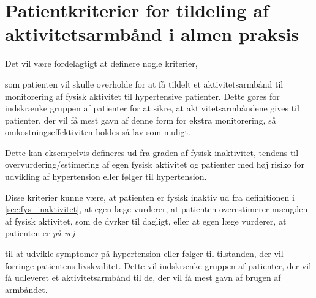 \section{Patientkriterier for tildeling af aktivitetsarmbånd i almen praksis}

\noindent
Det vil være fordelagtigt at definere nogle kriterier, %

som patienten vil skulle overholde for at få tildelt et aktivitetsarmbånd til monitorering af fysisk aktivitet til hypertensive patienter. Dette gøres for indskrænke gruppen af patienter for at sikre, at aktivitetsarmbåndene gives til patienter, der vil få mest gavn af denne form for ekstra monitorering, så omkostningseffektiviten holdes så lav som muligt.

Dette kan eksempelvis defineres ud fra graden af fysisk inaktivitet, tendens til overvurdering/estimering af egen fysisk aktivitet og patienter med høj risiko for udvikling af hypertension eller følger til hypertension. 

Disse kriterier kunne være, at patienten er fysisk inaktiv ud fra definitionen i \autoref{sec:fys_inaktivitet}, at egen læge vurderer, at patienten overestimerer mængden af fysisk aktivitet, som de dyrker til dagligt, eller at egen læge vurderer, at patienten er \textit{på vej} %

 til at udvikle symptomer på hypertension eller følger til tilstanden, der vil forringe patientens livskvalitet. Dette vil indskrænke gruppen af patienter, der vil få udleveret et aktivitetsarmbånd til de, der vil få mest gavn af brugen af armbåndet. 


